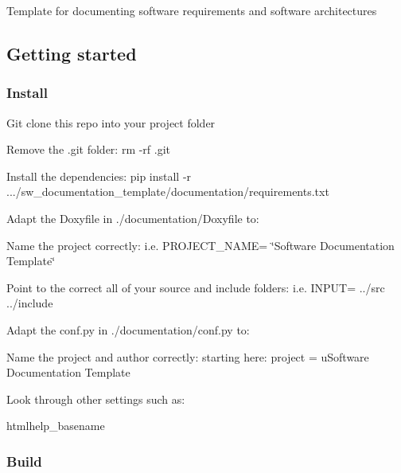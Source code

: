 \href{http://roboy-sw-documentation-template.readthedocs.io/en/lite/?badge=lite}{\tt }

Template for documenting software requirements and software architectures

\subsection*{Getting started}

\subsubsection*{Install}


\begin{DoxyItemize}
\item Git clone this repo into your project folder
\item Remove the .git folder\+: {\ttfamily rm -\/rf .git}
\item Install the dependencies\+: {\ttfamily pip install -\/r .../sw\+\_\+documentation\+\_\+template/documentation/requirements.txt}
\item Adapt the Doxyfile in ./documentation/\+Doxyfile to\+:
\begin{DoxyItemize}
\item Name the project correctly\+: i.\+e. {\ttfamily P\+R\+O\+J\+E\+C\+T\+\_\+\+N\+A\+ME= \char`\"{}\+Software Documentation Template\char`\"{}}
\item Point to the correct all of your source and include folders\+: i.\+e. {\ttfamily I\+N\+P\+UT= ../src ../include}
\end{DoxyItemize}
\item Adapt the conf.\+py in ./documentation/conf.py to\+:
\begin{DoxyItemize}
\item Name the project and author correctly\+: starting here\+: {\ttfamily project = u\textquotesingle{}Software Documentation Template\textquotesingle{}}
\item Look through other settings such as\+:
\begin{DoxyItemize}
\item {\ttfamily htmlhelp\+\_\+basename}
\end{DoxyItemize}
\end{DoxyItemize}
\end{DoxyItemize}

\subsubsection*{Build}

